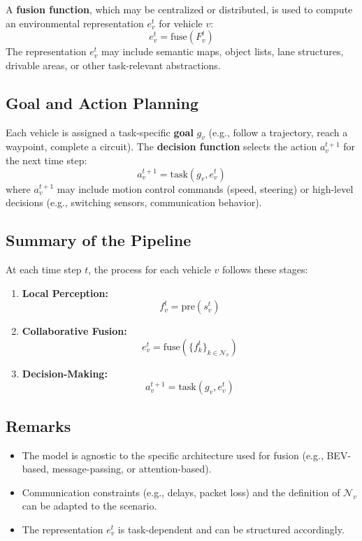 A \textbf{fusion function}, which may be centralized or distributed, is used to compute an environmental representation \( e_v^t \) for vehicle \( v \):
\[
e_v^t = \text{fuse}(F_v^t)
\]
The representation \( e_v^t \) may include semantic maps, object lists, lane structures, drivable areas, or other task-relevant abstractions.

\subsection{Goal and Action Planning}

Each vehicle is assigned a task-specific \textbf{goal} \( g_v \) (e.g., follow a trajectory, reach a waypoint, complete a circuit). The \textbf{decision function} selects the action \( a_v^{t+1} \) for the next time step:
\[
a_v^{t+1} = \text{task}(g_v, e_v^t)
\]
where \( a_v^{t+1} \) may include motion control commands (speed, steering) or high-level decisions (e.g., switching sensors, communication behavior).

\subsection{Summary of the Pipeline}

At each time step \( t \), the process for each vehicle \( v \) follows these stages:

\begin{enumerate}
    \item \textbf{Local Perception:}
    \[
    f_v^t = \text{pre}(s_v^t)
    \]
    
    \item \textbf{Collaborative Fusion:}
    \[
    e_v^t = \text{fuse}(\{f_k^t \}_{k \in \mathcal{N}_v})
    \]
    
    \item \textbf{Decision-Making:}
    \[
    a_v^{t+1} = \text{task}(g_v, e_v^t)
    \]
\end{enumerate}

\subsection{Remarks}

\begin{itemize}
    \item The model is agnostic to the specific architecture used for fusion (e.g., BEV-based, message-passing, or attention-based).
    \item Communication constraints (e.g., delays, packet loss) and the definition of \( \mathcal{N}_v \) can be adapted to the scenario.
    \item The representation \( e_v^t \) is task-dependent and can be structured accordingly.
\end{itemize}

